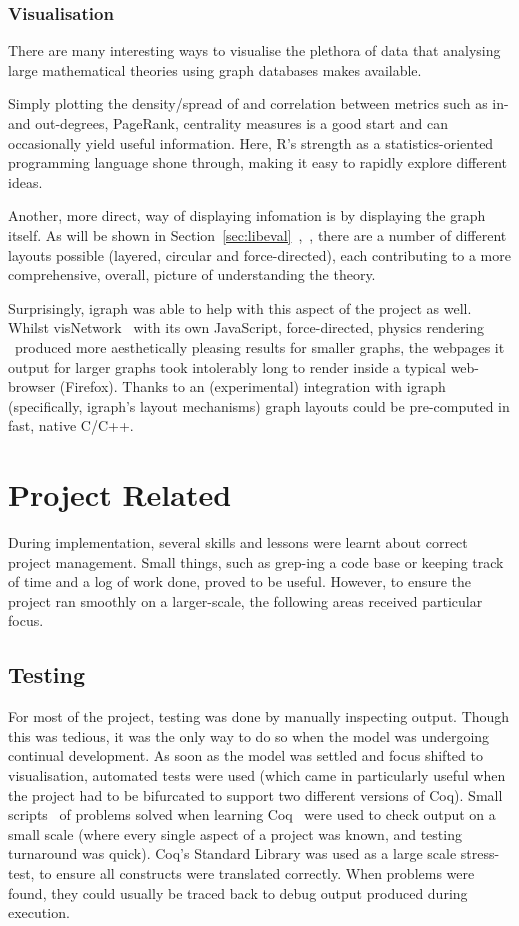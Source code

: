 \subsubsection{Visualisation}

There are many interesting ways to visualise the plethora of data that
analysing large mathematical theories using graph databases makes available.

Simply plotting the density/spread of and correlation between metrics such as
in- and out-degrees, PageRank, centrality measures is a good start and can
occasionally yield useful information. Here, R's strength as a
statistics-oriented programming language shone through, making it easy to
rapidly explore different ideas.

Another, more direct, way of displaying infomation is by displaying the graph
itself. As will be shown in
Section~\ref{sec:libeval}~,~, there
are a number of different layouts possible (layered, circular and
force-directed), each contributing to a more comprehensive, overall, picture of
understanding the theory.

Surprisingly, igraph was able to help with this aspect of the project as well.
Whilst visNetwork \textendash~with its own JavaScript, force-directed, physics
rendering \textendash~produced more aesthetically pleasing results for smaller
graphs, the webpages it output for larger graphs took intolerably long to render
inside a typical web-browser (Firefox). Thanks to an (experimental) integration
with igraph (specifically, igraph's layout mechanisms) graph layouts could be
pre-computed in fast, native C/C++.

\section{Project Related}

During implementation, several skills and lessons were learnt about correct
project management. Small things, such as grep-ing a code base or keeping track of
time and a log of work done, proved to be useful. However, to ensure the
project ran smoothly on a larger-scale, the following areas received particular
focus.

\subsection{Testing}

For most of the project, testing was done by manually inspecting output. Though
this was tedious, it was the only way to do so when the model was undergoing
continual development. As soon as the model was settled and focus shifted to
visualisation, automated tests were used (which came in particularly useful when
the project had to be bifurcated to support two different versions of Coq).
Small scripts \textendash~of problems solved when learning Coq \textendash~were
used to check output on a small scale (where every single aspect of a project
was known, and testing turnaround was quick). Coq's Standard Library was used as
a large scale stress-test, to ensure all constructs were translated correctly.
When problems were found, they could usually be traced back to debug output
produced during execution.

